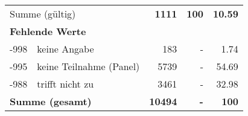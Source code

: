 \begin{longtable}{lXrrr}
     \midrule
     \multicolumn{2}{l}{Summe (gültig)} &
       \textbf{\num{1111}} &
     \textbf{\num{100}} &
       \textbf{\num[round-mode=places,round-precision=2]{10.59}} \\
     \multicolumn{5}{l}{\textbf{Fehlende Werte}}\\
       -998 &
       keine Angabe &
         \num{183} &
        - &
         \num[round-mode=places,round-precision=2]{1.74} \\
       -995 &
       keine Teilnahme (Panel) &
         \num{5739} &
        - &
         \num[round-mode=places,round-precision=2]{54.69} \\
       -988 &
       trifft nicht zu &
         \num{3461} &
        - &
         \num[round-mode=places,round-precision=2]{32.98} \\
     \midrule
     \multicolumn{2}{l}{\textbf{Summe (gesamt)}} &
          \textbf{\num{10494}} &
        \textbf{-} &
        \textbf{\num{100}} \\
     \bottomrule
     \end{longtable}
     
